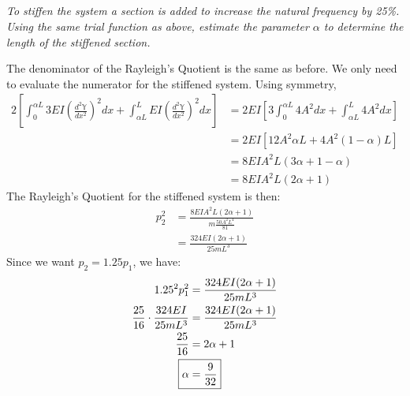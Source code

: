 \subsection{}
\textit{To stiffen the system a section is added to increase the natural frequency by 25\%. Using the same trial function as above, estimate the parameter $\alpha$ to determine the length of the stiffened section.}

The denominator of the Rayleigh's Quotient is the same as before. We only need to evaluate the numerator for the stiffened system. Using symmetry, 
\begin{align*}
    2 \left[\int_{0}^{\alpha L} 3 EI \left(\frac{d^2 \mathbb{Y}}{dx^2}\right)^2 dx + \int_{\alpha L}^{L} EI \left(\frac{d^2 \mathbb{Y}}{dx^2}\right)^2 dx\right] &= 2EI \left[3 \int_{0}^{\alpha L} 4A^2 dx + \int_{\alpha L}^{L} 4A^2 dx\right] \\
    &= 2EI \left[12A^2 \alpha L + 4A^2 (1 - \alpha) L\right] \\
    &= 8 E I A^2 L (3 \alpha + 1 - \alpha) \\
    &= 8 E I A^2 L (2 \alpha + 1)
\end{align*}
The Rayleigh's Quotient for the stiffened system is then:
\begin{align*}
    p_2^2 &= \frac{8 E I A^2 L (2 \alpha + 1)}{m \frac{50 A^2 L^4}{81}} \\
    &= \frac{324 E I (2 \alpha + 1)}{25 m L^3}
\end{align*}
Since we want $p_2 = 1.25 p_1$, we have:
\begin{align*}
    1.25^2 p_1^2 &= \frac{324 E I (2 \alpha + 1)}{25 m L^3} \\
    \frac{25}{16} \cdot \frac{324 E I}{25 m L^3} &= \frac{324 E I (2 \alpha + 1)}{25 m L^3} \\
    \frac{25}{16} &= 2 \alpha + 1 \\
    \Aboxed{\alpha &= \frac{9}{32}}
\end{align*}

